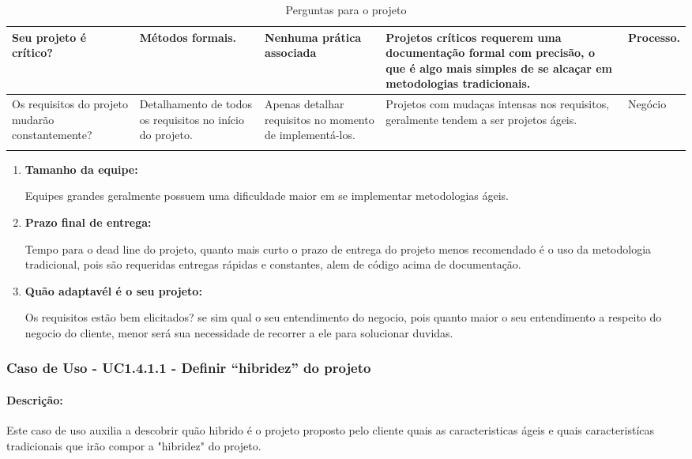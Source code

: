 \begin{longtable}{|p{3.5cm}|p{3.5cm}|p{3.5cm}|p{3.5cm}|p{2cm}|}
						Seu projeto é crítico? &
						Métodos formais. &
						Nenhuma prática associada &
						Projetos críticos requerem uma documentação formal com precisão, o que é algo mais simples de se alcaçar em metodologias tradicionais. &
						Processo.
						\\ \hline

						Os requisitos do projeto mudarão constantemente? &
						Detalhamento de todos os requisitos no início do projeto. &
						Apenas detalhar requisitos no momento de implementá-los. &
						Projetos com mudaças intensas nos requisitos, geralmente tendem a ser projetos ágeis. &
						Negócio
						\\ \hline
					\caption{Perguntas para o projeto}
					\label{tab:perguntas_projeto}
					\end{longtable}

					\begin{enumerate}
						\item \textbf{Tamanho da equipe:}

							Equipes grandes geralmente possuem uma dificuldade maior em se implementar metodologias ágeis.
					
		
											
						\item \textbf{Prazo final de entrega:}

							Tempo para o dead line do projeto, quanto mais curto o prazo de entrega do projeto menos recomendado é o uso da metodologia tradicional, pois são requeridas entregas rápidas e constantes, alem de código acima de documentação.

						\item \textbf{Quão adaptavél é o seu projeto:}
							
							Os requisitos estão bem elicitados? se sim qual o seu entendimento do negocio, pois quanto maior o seu entendimento a respeito do negocio do cliente, menor será sua necessidade de recorrer a ele para solucionar duvidas.
					\end{enumerate}
	
\subsubsection{Caso de Uso - UC1.4.1.1 - Definir ``hibridez'' do projeto}
\paragraph{Descrição:}
Este caso de uso auxilia a descobrir quão hibrido é o projeto proposto pelo cliente quais as caracteristicas ágeis e quais caracteristícas tradicionais que irão compor a "hibridez" do projeto.

